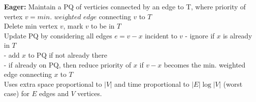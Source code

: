 \documentclass[letterpaper, 8pt]{extarticle}
\begin{document}
\begin{multicols*}{5}
  \textbf{Eager:} Maintain a PQ of verticies connected by an edge to T,
  where priority of vertex $v = \textit{min. weighted edge}$ connecting $v$ to $T$ \\
  Delete min vertex $v$, mark $v$ to be in $T$ \\
  Update PQ by considering all edges $e = v-x$ incident to $v$
  - ignore if $x$ is already in $T$ \\
  - add $x$ to PQ if not already there \\
  - if already on PQ, then reduce priority of $x$ if $v-x$ becomes the min. weighted edge connecting $x$ to $T$ \\
  Uses extra space proportional to $|V|$ and time proportional to $|E| \log |V|$ (worst case)
  for $E$ edges and $V$ vertices.

\end{multicols*}
\end{document}
